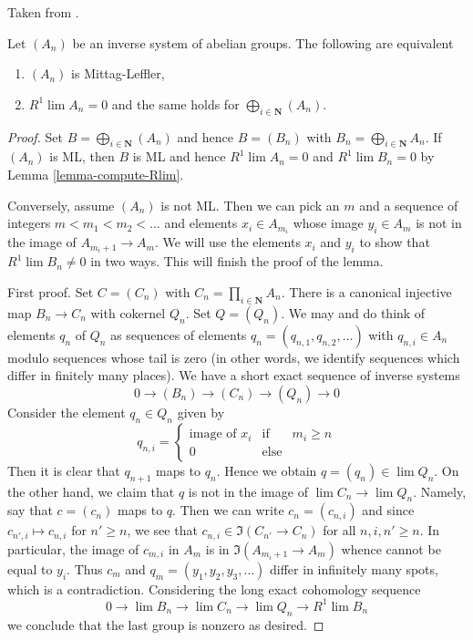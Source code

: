 \begin{lemma}[Emmanouil]
\label{lemma-emmanouil}
\begin{reference}
Taken from \cite{Emmanouil}.
\end{reference}
Let $(A_n)$ be an inverse system of abelian groups.
The following are equivalent
\begin{enumerate}
\item $(A_n)$ is Mittag-Leffler,
\item $R^1\lim A_n = 0$ and
the same holds for $\bigoplus_{i \in \mathbf{N}} (A_n)$.
\end{enumerate}
\end{lemma}

\begin{proof}
Set $B = \bigoplus_{i \in \mathbf{N}} (A_n)$ and hence
$B = (B_n)$ with $B_n = \bigoplus_{i \in \mathbf{N}} A_n$.
If $(A_n)$ is ML, then $B$ is ML and hence $R^1\lim A_n = 0$ and
$R^1\lim B_n = 0$ by Lemma \ref{lemma-compute-Rlim}.

\medskip\noindent
Conversely, assume $(A_n)$ is not ML. Then we can pick an $m$
and a sequence of integers $m < m_1 < m_2 < \ldots$ and elements
$x_i \in A_{m_i}$ whose image $y_i \in A_m$ is not in the
image of $A_{m_i + 1} \to A_m$.
We will use the elements $x_i$ and $y_i$ to
show that $R^1\lim B_n \not = 0$ in two ways.
This will finish the proof of the lemma.

\medskip\noindent
First proof.
Set $C = (C_n)$ with $C_n = \prod_{i \in \mathbf{N}} A_n$.
There is a canonical injective map $B_n \to C_n$ with cokernel
$Q_n$. Set $Q = (Q_n)$. We may and do think of elements $q_n$ of $Q_n$
as sequences of elements $q_n = (q_{n, 1}, q_{n, 2}, \ldots)$
with $q_{n, i} \in A_n$ modulo sequences whose tail is zero
(in other words, we identify sequences which differ in
finitely many places).
We have a short exact sequence of inverse systems
$$
0 \to (B_n) \to (C_n) \to (Q_n) \to 0
$$
Consider the element $q_n \in Q_n$ given by
$$
q_{n, i} =
\left\{
\begin{matrix}
\text{image of }x_i &\text{if}& m_i \geq n \\
0 & \text{else}
\end{matrix}
\right.
$$
Then it is clear that $q_{n + 1}$ maps to $q_n$.
Hence we obtain $q = (q_n) \in \lim Q_n$.
On the other hand, we claim that $q$ is not in the image
of $\lim C_n \to \lim Q_n$. Namely, say that $c = (c_n)$
maps to $q$. Then we can write $c_n = (c_{n, i})$ and since
$c_{n', i} \mapsto c_{n, i}$ for $n' \geq n$, we see that
$c_{n, i} \in \Im(C_{n'} \to C_n)$ for all $n, i, n' \geq n$.
In particular, the image of $c_{m, i}$ in $A_m$ is in
$\Im(A_{m_i + 1} \to A_m)$ whence cannot be equal to $y_i$.
Thus $c_m$ and $q_m = (y_1, y_2, y_3, \ldots)$
differ in infinitely many spots, which
is a contradiction. Considering the long exact cohomology sequence
$$
0 \to \lim B_n \to \lim C_n \to \lim Q_n \to R^1\lim B_n
$$
we conclude that the last group is nonzero as desired.


\end{proof}
